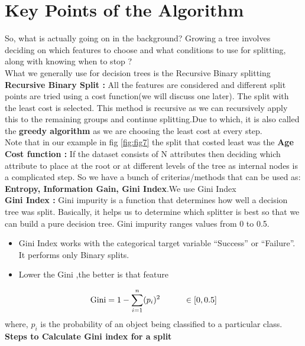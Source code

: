 \documentclass[a4paper, 11pt]{article}
\begin{document}
\section{Key Points of the Algorithm}
So, what is actually going on in the background? Growing a tree involves deciding on which features to choose and what conditions to use for splitting, along with knowing when to stop ?\\
\vspace{3mm}
What we generally use for decision trees is the Recursive Binary splitting \\
\textbf{Recursive Binary Split :} All the features are considered and different split points are tried using a cost function(we will discuss one later). The split with the least cost is selected. This method is recursive as we can
recursively apply this to the remaining groups and continue splitting.Due to which, it is also called the \textbf{greedy algorithm} as we are choosing the least cost at every step.\\ Note that in our example in fig \ref*{fig:fig7} the split that costed least 
was the \textbf{Age} \vspace{3mm} \\
\textbf{Cost function :} If the dataset consists of N attributes then deciding which attribute to place at the root or at different levels of the tree as internal nodes is a complicated step. So we have a bunch of criterias/methods that can be used as:
\textbf{Entropy, Information Gain, Gini Index}.We use Gini Index\\
\textbf{Gini Index :} Gini impurity is a function that determines how well a decision tree was split. Basically, it helps us to determine which splitter is best so that we can build a pure decision tree. Gini impurity ranges values from 0 to 0.5. 
\begin{itemize}
    \item Gini Index works with the categorical target variable “Success” or “Failure”. It performs only Binary splits.
    \item Lower the Gini ,the better is that feature 
\end{itemize}
\begin{align}
    \text{Gini} = 1 - \sum_{i=1}^{n}(p_i)^2 \hspace{10mm}\in[0,0.5]
\end{align}
where, $p_i$ is the probability of an object being classified to a particular class.\\
\textbf{Steps to Calculate Gini index for a split} \\
\end{document}
